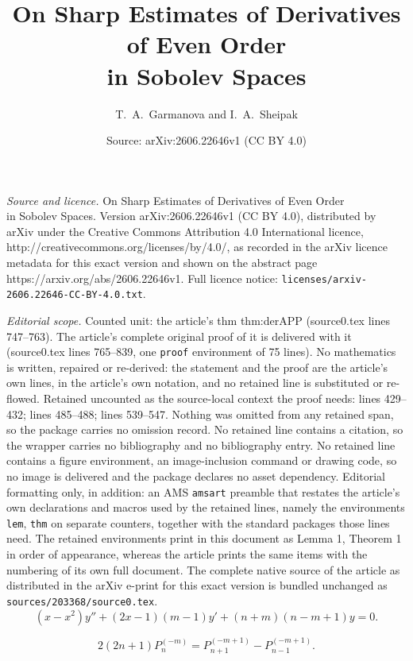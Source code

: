 \documentclass[10pt,a4paper]{amsart}
\title{On Sharp Estimates of Derivatives of Even Order\\ in Sobolev Spaces}
\author{T.~A.~Garmanova and I.~A.~Sheipak}
\date{Source: arXiv:2606.22646v1 (CC BY 4.0)}
\begin{document}
\maketitle

\noindent\emph{Source and licence.} On Sharp Estimates of Derivatives of Even Order\\ in Sobolev Spaces. Version arXiv:2606.22646v1 (CC BY 4.0), distributed by arXiv under the Creative Commons Attribution 4.0 International licence, http://creativecommons.org/licenses/by/4.0/, as recorded in the arXiv licence metadata for this exact version and shown on the abstract page https://arxiv.org/abs/2606.22646v1. Full licence notice: \texttt{licenses/arxiv-2606.22646-CC-BY-4.0.txt}.\par\smallskip

\noindent\textit{Editorial scope.} Counted unit: the article's thm thm:derAPP (source0.tex lines 747--763). The article's complete original proof of it is delivered with it (source0.tex lines 765--839, one \texttt{proof} environment of 75 lines). No mathematics is written, repaired or re-derived: the statement and the proof are the article's own lines, in the article's own notation, and no retained line is substituted or re-flowed.  Retained uncounted as the source-local context the proof needs: lines 429--432; lines 485--488; lines 539--547.  Nothing was omitted from any retained span, so the package carries no omission record.  No retained line contains a citation, so the wrapper carries no bibliography and no bibliography entry.  No retained line contains a figure environment, an image-inclusion command or drawing code, so no image is delivered and the package declares no asset dependency.  Editorial formatting only, in addition: an AMS \texttt{amsart} preamble that restates the article's own declarations and macros used by the retained lines, namely the environments \texttt{lem}, \texttt{thm} on separate counters, together with the standard packages those lines need.  The retained environments print in this document as Lemma 1, Theorem 1 in order of appearance, whereas the article prints the same items with the numbering of its own full document.  The complete native source of the article as distributed in the arXiv e-print for this exact version is bundled unchanged as \texttt{sources/203368/source0.tex}.
\begin{equation}
\label{eq:Pdifur}
(x-x^2)y''+(2x-1)(m-1)y'+(n+m)(n-m+1)y=0.
\end{equation}

\begin{equation}
\label{eq:Prec}
2(2n+1) P_{n}^{(-m)}=P_{n+1}^{(-m+1)}-P_{n-1}^{(-m+1)}.
\end{equation}
\end{document}
